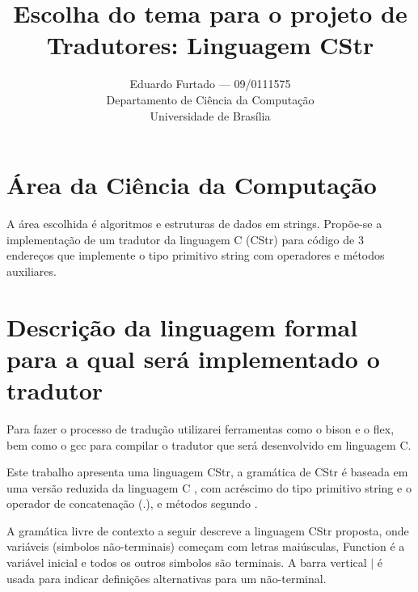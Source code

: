 \documentclass[12pt]{article}
\title{Escolha do tema para o projeto de Tradutores: Linguagem CStr}
\author{Eduardo Furtado --- 09/0111575\\Departamento de Ciência da Computação\\Universidade de Brasília}
\begin{document}
\maketitle
	
\section{Área da Ciência da Computação}

\indent

A área escolhida é algoritmos e estruturas de dados em strings. Propõe-se a implementação de um tradutor da linguagem C (CStr) para código de 3 endereços que implemente o tipo primitivo string com operadores e métodos auxiliares. \\

\section{Descrição da linguagem formal para a qual será implementado o tradutor}

\indent

Para fazer o processo de tradução utilizarei ferramentas como o bison e o flex, bem como o gcc para compilar o tradutor que será desenvolvido em linguagem C.

Este trabalho apresenta uma linguagem CStr, a gramática de CStr é baseada em uma versão reduzida da linguagem C \cite{minic}, com acréscimo do tipo primitivo string e o operador de concatenação (.), e métodos segundo \cite{cplusplus}.

A gramática livre de contexto a seguir descreve a linguagem CStr proposta, onde variáveis (simbolos não-terminais) começam com letras maiúsculas, Function é a variável inicial e todos os outros simbolos são terminais. A barra vertical $|$ é usada para indicar definições alternativas para um não-terminal.\\
\end{document}
